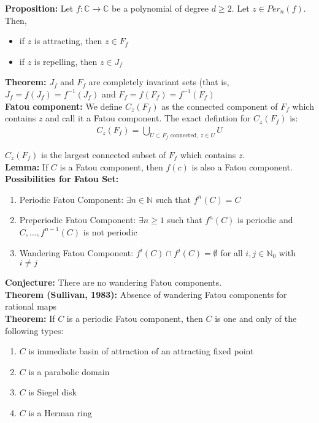 \documentclass[12pt]{article}
\begin{document}
\textbf{Proposition:} Let $f: \mathbb{C} \to \mathbb{C}$ be a polynomial of degree $d \geq 2$. Let $z \in Per_n(f)$. Then,
\begin{itemize}
\item if $z$ is attracting, then $z \in F_f$
\item if $z$ is repelling, then $z \in J_f$
\end{itemize}

\textbf{Theorem:} $J_f$ and $F_f$ are completely invariant sets (that is, $J_f = f(J_f) = f^{-1}(J_f)$ and $F_f = f(F_f) = f^{-1}(F_f)$\\

\textbf{Fatou component:} We define $C_z(F_f)$ as the connected component of $F_f$ which contains $z$ and call it a Fatou component. The exact defintion for $C_z(F_f)$ is:
\begin{align*}
C_z(F_f) = \bigcup_{U \subset F_f \text{ connected}, \ z \in U} U
\end{align*}

$C_z(F_f)$ is the largest connected subset of $F_f$ which contains $z$.\\

\textbf{Lemma:} If $C$ is a Fatou component, then $f(c)$ is also a Fatou component.\\

\textbf{Possibilities for Fatou Set:}
\begin{enumerate}[label=(\alph*)]

\item Periodic Fatou Component: $\exists n \in \mathbb{N}$ such that $f^n(C) = C$

\item Preperiodic Fatou Component: $\exists n \geq 1$ such that $f^n(C)$ is periodic and $C, \ldots, f^{n-1}(C)$ is not periodic

\item Wandering Fatou Component: $f^i(C) \cap f^j(C) = \emptyset$ for all $i, j \in \mathbb{N}_0$ with $i \neq j$\\
\end{enumerate}

\textbf{Conjecture:} There are no wandering Fatou components.\\

\textbf{Theorem (Sullivan, 1983):} Absence of wandering Fatou components for rational maps\\

\textbf{Theorem:} If $C$ is a periodic Fatou component, then $C$ is one and only of the following types:
\begin{enumerate}
\item $C$ is immediate basin of attraction of an attracting fixed point
\item $C$ is a parabolic domain
\item $C$ is Siegel disk
\item $C$ is a Herman ring
\end{enumerate}
\end{document}
